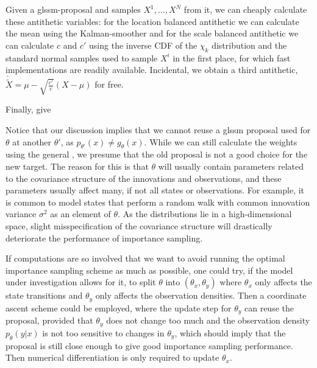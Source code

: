 Given a \acrshort{glssm}-proposal and samples $X^{1}, \dots, X^{N}$ from it, we can cheaply calculate these antithetic variables: for the location balanced antithetic we can calculate the mean using the Kalman-smoother and for the scale balanced antithetic we can calculate $c$ and $c'$ using the inverse CDF of the $\chi_{k}$ distribution and the standard normal samples used to sample $X^{i}$ in the first place, for which fast implementations are readily available. Incidental, we obtain a third antithetic, $\check{\tilde X} = \mu - \sqrt{ \frac{c'}{c}} (X - \mu)$ for free. 

Finally, \citep{Durbin1997Monte} give 




Notice that our discussion implies that we cannot reuse a \acrshort{glssm} proposal used for $\theta$ at another $\theta'$, as $p_{\theta'}(x) \neq g_{\theta}(x)$. While we can still calculate the weights using the general , we presume that the old proposal is not a good choice for the new target. The reason for this is that $\theta$ will usually contain parameters related to the covariance structure of the innovations and observations, and these parameters usually affect many, if not all states or observations. For example, it is common to model states that perform a random walk with common innovation variance $\sigma^{2}$ as an element of $\theta$. As the distributions lie in a high-dimensional space, slight misspecification of the covariance structure will drastically deteriorate the performance of importance sampling. 

If computations are so involved that we want to avoid running the optimal importance sampling scheme as much as possible, one could try, if the model under investigation allows for it, to split $\theta$ into $(\theta_{x}, \theta_y)$ where $\theta_{x}$ only affects the state transitions and $\theta_{y}$ only affects the observation densities. Then a coordinate ascent scheme could be employed, where the update step for $\theta_{y}$ can reuse the proposal, provided that $\theta_{y}$ does not change too much and the observation density $p_{\theta}(y|x)$ is not too sensitive to changes in $\theta_{y}$, which should imply that the proposal is still close enough to give good importance sampling performance. Then numerical differentiation is only required to update $\theta_{x}$. 



